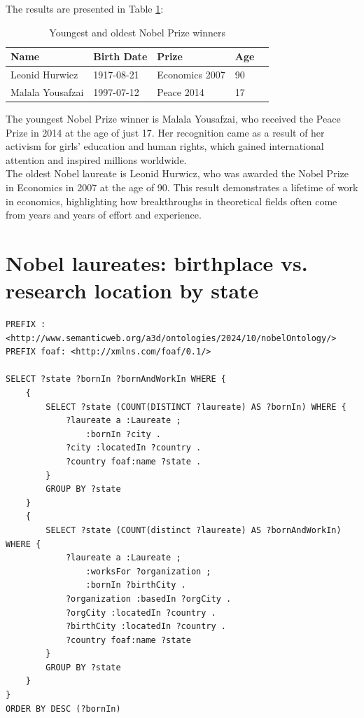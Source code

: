 \documentclass{article}
\begin{document}
The results are presented in Table \ref{tab:youngest_oldest}:

\begin{table}[H]
	\centering
	\caption{Youngest and oldest Nobel Prize winners}
	\begin{tabular}{|l|l|l|l|c|}
		\hline
		\textbf{Name}    & \textbf{Birth Date} & \textbf{Prize} & \textbf{Age} \\ \hline
		Leonid Hurwicz   & 1917-08-21          & Economics 2007 & 90           \\ \hline
		Malala Yousafzai & 1997-07-12          & Peace 2014     & 17           \\ \hline
	\end{tabular}
	\label{tab:youngest_oldest}
\end{table}

The youngest Nobel Prize winner is Malala Yousafzai, who received the Peace Prize in 2014 at the age of just 17.
Her recognition came as a result of her activism for girls' education and human rights, which gained international
attention and inspired millions worldwide.\\
The oldest Nobel laureate is Leonid Hurwicz, who was awarded the Nobel Prize in Economics in 2007 at the age of 90.
This result demonstrates a lifetime of work in economics, highlighting how breakthroughs in theoretical fields
often come from years and years of effort and experience.

\newpage

\section{Nobel laureates: birthplace vs. research location by state}
\begin{lstlisting}
PREFIX : <http://www.semanticweb.org/a3d/ontologies/2024/10/nobelOntology/>
PREFIX foaf: <http://xmlns.com/foaf/0.1/>

SELECT ?state ?bornIn ?bornAndWorkIn WHERE {
    {
        SELECT ?state (COUNT(DISTINCT ?laureate) AS ?bornIn) WHERE {
            ?laureate a :Laureate ;
                :bornIn ?city .
            ?city :locatedIn ?country .
            ?country foaf:name ?state .
        }
        GROUP BY ?state
    }
    {
        SELECT ?state (COUNT(distinct ?laureate) AS ?bornAndWorkIn) WHERE {
            ?laureate a :Laureate ;
                :worksFor ?organization ;
                :bornIn ?birthCity .
            ?organization :basedIn ?orgCity .
            ?orgCity :locatedIn ?country .
            ?birthCity :locatedIn ?country .
            ?country foaf:name ?state
        }
        GROUP BY ?state
    }
}
ORDER BY DESC (?bornIn)
\end{lstlisting}
\end{document}
